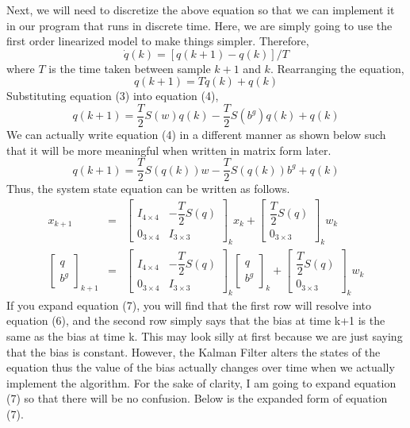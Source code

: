 \documentclass[a4paper,12pt]{book}
\begin{document}
Next, we will need to discretize the above equation so that we can implement it in our program that runs in discrete time. Here, we are simply going to use the first order linearized model to make things simpler. Therefore,
\begin{equation}
    \dot{q}(k) = [q(k+1) - q(k)] / T
\end{equation}
where $T$ is the time taken between sample $k+1$ and $k$. Rearranging the equation,
\begin{equation}
    q(k+1) = T\dot{q}(k) + q(k)
\end{equation}
Substituting equation (3) into equation (4),
\begin{equation}
    q(k+1) = \dfrac{T}{2}S(w)q(k) - \dfrac{T}{2}S(b^g)q(k) + q(k)
\end{equation}
We can actually write equation (4) in a different manner as shown below such that it will be more meaningful when written in matrix form later.
\begin{equation}
    q(k+1) = \dfrac{T}{2}S(q(k))w - \dfrac{T}{2}S(q(k))b^g + q(k)
\end{equation}
Thus, the system state equation can be written as follows.
\begin{eqnarray}
    x_{k+1} &=& \begin{bmatrix} I_{4\times4} & - \dfrac{T}{2}S(q) \\ 0_{3\times4} & I_{3\times3} \end{bmatrix}_kx_k + \begin{bmatrix} \dfrac{T}{2}S(q) \\ 0_{3\times3} \end{bmatrix}_kw_k \\
    \begin{bmatrix} q \\ b^g \end{bmatrix}_{k+1} &=& \begin{bmatrix} I_{4\times4} & - \dfrac{T}{2}S(q) \\ 0_{3\times4} & I_{3\times3} \end{bmatrix}_k\begin{bmatrix} q \\ b^g \end{bmatrix}_k + \begin{bmatrix} \dfrac{T}{2}S(q) \\ 0_{3\times3} \end{bmatrix}_kw_k
\end{eqnarray}
If you expand equation (7), you will find that the first row will resolve into equation (6), and the second row simply says that the bias at time k+1 is the same as the bias at time k. This may look silly at first because we are just saying that the bias is constant. However, the Kalman Filter alters the states of the equation thus the value of the bias actually changes over time when we actually implement the algorithm. For the sake of clarity, I am going to expand equation (7) so that there will be no confusion. Below is the expanded form of equation (7).
\end{document}
